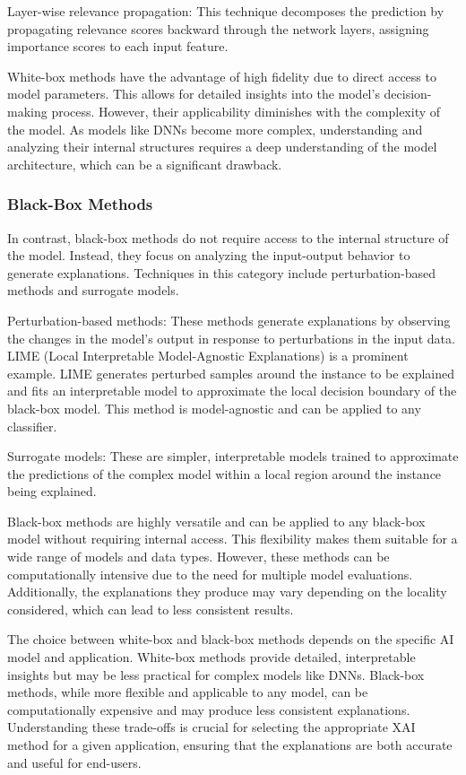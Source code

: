 \documentclass{article}
\begin{document}
Layer-wise relevance propagation: This technique decomposes the prediction by propagating relevance scores backward through the network layers, assigning importance scores to each input feature.

White-box methods have the advantage of high fidelity due to direct access to model parameters. This allows for detailed insights into the model’s decision-making process. However, their applicability diminishes with the complexity of the model. As models like DNNs become more complex, understanding and analyzing their internal structures requires a deep understanding of the model architecture, which can be a significant drawback.

\subsubsection{Black-Box Methods}
In contrast, black-box methods do not require access to the internal structure of the model. Instead, they focus on analyzing the input-output behavior to generate explanations. Techniques in this category include perturbation-based methods and surrogate models.

Perturbation-based methods: These methods generate explanations by observing the changes in the model’s output in response to perturbations in the input data. LIME (Local Interpretable Model-Agnostic Explanations) is a prominent example. LIME generates perturbed samples around the instance to be explained and fits an interpretable model to approximate the local decision boundary of the black-box model. This method is model-agnostic and can be applied to any classifier.

Surrogate models: These are simpler, interpretable models trained to approximate the predictions of the complex model within a local region around the instance being explained.

Black-box methods are highly versatile and can be applied to any black-box model without requiring internal access. This flexibility makes them suitable for a wide range of models and data types. However, these methods can be computationally intensive due to the need for multiple model evaluations. Additionally, the explanations they produce may vary depending on the locality considered, which can lead to less consistent results.

The choice between white-box and black-box methods depends on the specific AI model and application. White-box methods provide detailed, interpretable insights but may be less practical for complex models like DNNs. Black-box methods, while more flexible and applicable to any model, can be computationally expensive and may produce less consistent explanations. Understanding these trade-offs is crucial for selecting the appropriate XAI method for a given application, ensuring that the explanations are both accurate and useful for end-users.
\end{document}

